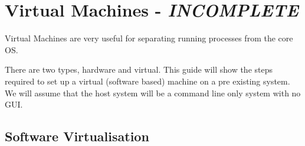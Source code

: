 \chapter{Virtual Machines - \textit{INCOMPLETE}}
\label{chp:vm}

Virtual Machines are very useful for separating running processes from the core OS.

There are two types, hardware and virtual.  This guide will show the steps required to set up a virtual (software based) machine on a pre existing system.  We will assume that the host system will be a command line only system with no GUI.

\section{Software Virtualisation}
\label{sec:svm}

